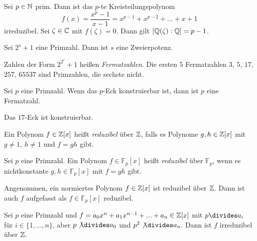 \documentclass{cheat-sheet}
\newcommand{\F}{\mathbb{F}} %
\begin{document}
\begin{lem}
  Sei $p \in \mathbb{N}$ prim. Dann ist das $p$-te Kreisteilungspolynom
  \[ f(x) = \frac{x^p - 1}{x-1} = x^{p-1} + x^{p-2} + ... + x + 1 \]
  irreduzibel. Sei $\zeta \in \mathbb{C}$ mit $f(\zeta) = 0$. Dann gilt $[ \mathbb{Q}(\zeta) : \mathbb{Q} ] = p-1$.
\end{lem}

\begin{lem}
  Sei $2^s + 1$ eine Primzahl. Dann ist $s$ eine Zweierpotenz.
\end{lem}

\begin{bem}
  Zahlen der Form $2^{2^r} + 1$ heißen \emph{Fermatzahlen}. Die ersten $5$ Fermatzahlen
  $3$, $5$, $17$, $257$, $65537$ sind Primzahlen, die sechste nicht.
\end{bem}

\begin{satz}
  Sei $p$ eine Primzahl. Wenn das $p$-Eck konstruierbar ist, dann ist $p$ eine Fermatzahl.
\end{satz}

\begin{satz}[Gauß]
  Das $17$-Eck ist konstruierbar.
\end{satz}


\begin{defn}
  Ein Polynom $f \in \mathbb{Z}[x]$ heißt \emph{reduzibel} über $\mathbb{Z}$, falls es Polynome $g, h \in \mathbb{Z}[x]$ mit $g \not= 1$, $h \not= 1$ und $f = gh$ gibt.
\end{defn}

\begin{defn}
  Sei $p$ eine Primzahl. Ein Polynom $f \in \F_p[x]$ heißt \emph{reduzibel} über $\F_p$, wenn es nichtkonstante $g, h \in \F_p[x]$ mit $f = gh$ gibt.
\end{defn}

\begin{defn}
  Angenommen, ein normiertes Polynom $f \in \mathbb{Z}[x]$ ist reduzibel über $\mathbb{Z}$. Dann ist auch $f$ aufgefasst als $f \in \F_p[x]$ reduzibel.
\end{defn}

\begin{satz}[Eisenstein]
  Sei $p$ eine Primzahl und $f = a_0 x^n + a_1 x^{n-1} + ... + a_n \in \mathbb{Z}[x]$ mit $p \divides a_i$ für $i \in \{ 1, ..., n \}$, aber $p \not\divides a_0$ und $p^2 \not\divides a_n$. Dann ist $f$ irreduzibel über $\mathbb{Z}$.
\end{satz}
\end{document}
